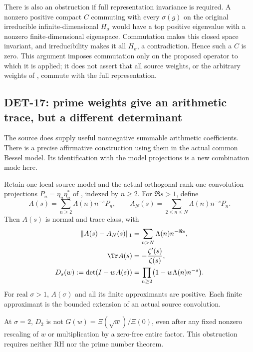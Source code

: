 There is also an obstruction if full representation invariance is
required.  A nonzero positive compact \(C\) commuting with every
\(\sigma(g)\) on the original irreducible infinite-dimensional
\(H_\sigma\) would have a top positive eigenvalue with a nonzero
finite-dimensional eigenspace.  Commutation makes this closed
space invariant, and irreducibility makes it all \(H_\sigma\),
a contradiction.  Hence such a \(C\) is zero.
This argument imposes commutation only on the proposed operator
to which it is applied; it does not assert that all source
weights, or the arbitrary weights of , commute with
the full representation.

\subsection{DET-17: prime weights give an arithmetic trace, but a different determinant}

The source does supply useful nonnegative summable arithmetic
coefficients.  There is a precise affirmative construction using
them in the actual common Bessel model.  Its identification with
the model projections is a new combination made here.

\begin{proposition}[DET-17]
Retain one local source model and the actual orthogonal rank-one
convolution projections \(P_n=\eta_n\eta_n^*\) of ,
indexed by \(n\ge2\).  For \(\Re s>1\), define
\begin{equation}\label{eq:bessel-prime-operator}
 A(s)=\sum_{n\ge2}\Lambda(n)n^{-s}P_n,\qquad
 A_N(s)=\sum_{2\le n\le N}\Lambda(n)n^{-s}P_n .
\end{equation}
Then \(A(s)\) is normal and trace class, with
\begin{align}
 \|A(s)-A_N(s)\|_1
 &=\sum_{n>N}\Lambda(n)n^{-\Re s},
 \label{eq:bessel-prime-tail}\\
 \Tr A(s)&=-\frac{\zeta'(s)}{\zeta(s)},\\
 D_s(w):=\det(I-wA(s))
 &=\prod_{n\ge2}\bigl(1-w\Lambda(n)n^{-s}\bigr).
 \label{eq:bessel-prime-det}
\end{align}
For real \(\sigma>1\), \(A(\sigma)\) and all its finite
approximants are positive.  Each finite approximant is the
bounded extension of an actual source convolution.

At \(\sigma=2\), \(D_2\) is not \(G(w)=\Xi(\sqrt w)/\Xi(0)\),
even after any fixed nonzero rescaling of \(w\) or multiplication
by a zero-free entire factor.  This obstruction requires neither
RH nor the prime number theorem.
\end{proposition}


